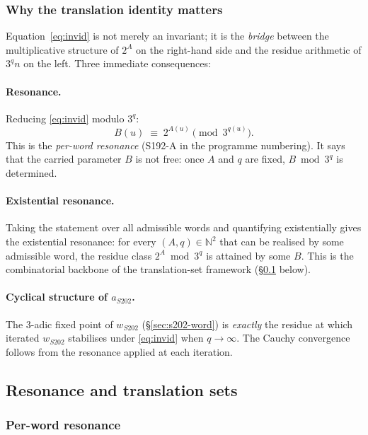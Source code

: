 \documentclass[11pt,a4paper]{article}
\theoremstyle{plain}
\theoremstyle{definition}
\newcommand{\NN}{\mathbb{N}}
\newcommand{\aS}{a_{S202}}
\newcommand{\wS}{w_{S202}}
\begin{document}
\subsubsection*{Why the translation identity matters}

Equation~\eqref{eq:invid} is not merely an invariant; it is the
\emph{bridge} between the multiplicative structure of $2^A$ on the
right-hand side and the residue arithmetic of $3^q n$ on the
left. Three immediate consequences:

\paragraph{Resonance.}
Reducing \eqref{eq:invid} modulo $3^q$:
\[
  B(u) \;\equiv\; 2^{A(u)} \pmod{3^{q(u)}}.
\]
This is the \emph{per-word resonance} (S192-A in the programme
numbering). It says that the carried parameter $B$ is not free:
once $A$ and $q$ are fixed, $B \bmod 3^q$ is determined.

\paragraph{Existential resonance.}
Taking the statement over all admissible words and quantifying
existentially gives the existential resonance: for every
$(A, q) \in \NN^2$ that can be realised by some admissible word,
the residue class
$2^A \bmod 3^q$ is attained by some $B$. This is the
combinatorial backbone of the translation-set framework
(\S\ref{sec:translation-sets} below).

\paragraph{Cyclical structure of $\aS$.}
The 3-adic fixed point of $\wS$ (\S\ref{sec:s202-word}) is
\emph{exactly} the residue at which iterated $\wS$ stabilises
under \eqref{eq:invid} when $q \to \infty$. The Cauchy convergence
follows from the resonance applied at each iteration.

\subsection{Resonance and translation sets}\label{sec:translation-sets}

\subsubsection*{Per-word resonance}
\end{document}
